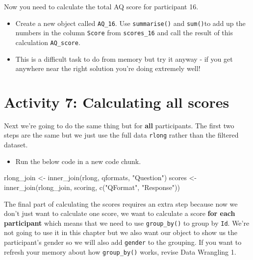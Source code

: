 \documentclass[
  oneside]{book}
\newenvironment{Shaded}{\begin{snugshade}}{\end{snugshade}}
\newcommand{\FunctionTok}[1]{\textcolor[rgb]{0.00,0.00,0.00}{#1}}
\newcommand{\NormalTok}[1]{#1}
\newcommand{\OtherTok}[1]{\textcolor[rgb]{0.56,0.35,0.01}{#1}}
\newcommand{\StringTok}[1]{\textcolor[rgb]{0.31,0.60,0.02}{#1}}
\providecommand{\tightlist}{%
  \setlength{\itemsep}{0pt}\setlength{\parskip}{0pt}}
\begin{document}
Now you need to calculate the total AQ score for participant 16.

\begin{itemize}
\tightlist
\item
  Create a new object called \texttt{AQ\_16}. Use \texttt{summarise()} and \texttt{sum()}to add up the numbers in the column \texttt{Score} from \texttt{scores\_16} and call the result of this calculation \texttt{AQ\_score}.
\item
  This is a difficult task to do from memory but try it anyway - if you get anywhere near the right solution you're doing extremely well!
\end{itemize}

\hypertarget{activity-7-calculating-all-scores}{%
\section{Activity 7: Calculating all scores}\label{activity-7-calculating-all-scores}}

Next we're going to do the same thing but for \textbf{all} participants. The first two steps are the same but we just use the full data \texttt{rlong} rather than the filtered dataset.

\begin{itemize}
\tightlist
\item
  Run the below code in a new code chunk.
\end{itemize}

\begin{Shaded}
\begin{Highlighting}[]
\NormalTok{rlong\_join }\OtherTok{\textless{}{-}} \FunctionTok{inner\_join}\NormalTok{(rlong, qformats, }\StringTok{"Question"}\NormalTok{)}
\NormalTok{scores }\OtherTok{\textless{}{-}} \FunctionTok{inner\_join}\NormalTok{(rlong\_join, scoring, }\FunctionTok{c}\NormalTok{(}\StringTok{"QFormat"}\NormalTok{, }\StringTok{"Response"}\NormalTok{))}
\end{Highlighting}
\end{Shaded}

The final part of calculating the scores requires an extra step because now we don't just want to calculate one score, we want to calculate a score \textbf{for each participant} which means that we need to use \texttt{group\_by()} to group by \texttt{Id}. We're not going to use it in this chapter but we also want our object to show us the participant's gender so we will also add \texttt{gender} to the grouping. If you want to refresh your memory about how \texttt{group\_by()} works, revise Data Wrangling 1.
\end{document}
